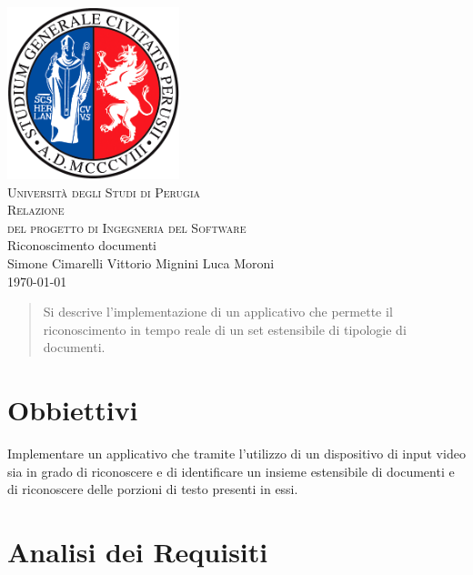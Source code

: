 \documentclass[12pt,a4paper]{article}
\begin{document}
\begin{titlepage}
    \centering
    \includegraphics[width=5cm,keepaspectratio]{logo_unipg.png}\\
    \vspace{.8cm}
    \large\textsc{Università degli Studi di Perugia}\\
    \vspace{1cm}
    \Huge\textsc{Relazione}\\
    \Large\textsc{del progetto di Ingegneria del Software}\\
    \vspace{1.2cm}
    \Huge Riconoscimento documenti\\
    \vspace{.8cm}
    \large Simone Cimarelli \qquad Vittorio Mignini \qquad Luca Moroni\\
    \vspace{.5cm}
    \large\today
\end{titlepage}

\tableofcontents
\pagebreak

\begin{abstract}
    Si descrive l'implementazione di un applicativo che permette il
    riconoscimento in tempo reale di un set estensibile di tipologie di
    documenti.
\end{abstract}

\section{Obbiettivi}

Implementare un applicativo che tramite l'utilizzo di un dispositivo di
input video sia in grado di riconoscere e di identificare un insieme
estensibile di documenti e di riconoscere delle porzioni di testo
presenti in essi.

\section{Analisi dei Requisiti}
\end{document}
